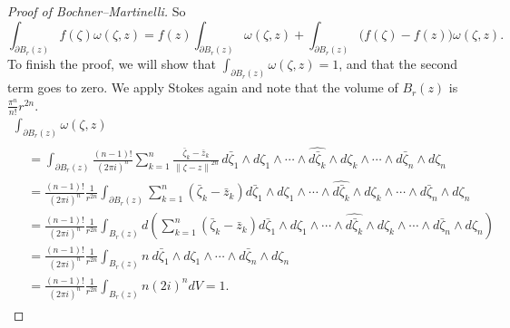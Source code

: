\documentclass[12pt,openany]{book}
\newcommand{\norm}[1]{\left\lVert {#1} \right\rVert}
\theoremstyle{plain}
\theoremstyle{remark}
\theoremstyle{definition}
\theoremstyle{exercise}
\theoremstyle{example}
\begin{document}
\begin{proof}[Proof of Bochner--Martinelli]
So
\begin{equation*}
\int_{\partial B_r(z)}
f(\zeta) \omega(\zeta,z)
=
f(z)
\int_{\partial B_r(z)}
\omega(\zeta,z)
+
\int_{\partial B_r(z)}
\bigl(f(\zeta)-f(z)\bigr) \omega(\zeta,z) .
\end{equation*}
To finish the proof,
we will show that
$\int_{\partial B_r(z)}
\omega(\zeta,z) = 1$, and that the second term goes to zero.
We apply Stokes again
and note that the volume of $B_r(z)$ is
$\frac{\pi^n}{n!}r^{2n}$.
\begin{multline*}
\int_{\partial B_r(z)}
\omega(\zeta,z)
\\
\begin{aligned}
&=
\int_{\partial B_r(z)}
\frac{(n-1)!}{{(2\pi i)}^n}
\sum_{k=1}^n
\frac{\bar{\zeta}_k-\bar{z}_k}{\norm{\zeta-z}^{2n}} \,
d\bar{\zeta}_1 \wedge d\zeta_1 \wedge
\cdots \wedge
\widehat{ d\bar{\zeta}_k } \wedge d\zeta_k \wedge
\cdots \wedge
d\bar{\zeta}_n \wedge d\zeta_n
\\
&=
\frac{(n-1)!}{{(2\pi i)}^n}\frac{1}{r^{2n}}
\int_{\partial B_r(z)}
\sum_{k=1}^n(\bar{\zeta}_k-\bar{z}_k)
d\bar{\zeta}_1 \wedge d\zeta_1 \wedge
\cdots \wedge
\widehat{ d\bar{\zeta}_k } \wedge d\zeta_k \wedge
\cdots \wedge
d\bar{\zeta}_n \wedge d\zeta_n
\\
&=
\frac{(n-1)!}{{(2\pi i)}^n}\frac{1}{r^{2n}}
\int_{B_r(z)}
\!
d\left(
\sum_{k=1}^n(\bar{\zeta}_k-\bar{z}_k)
d\bar{\zeta}_1 \wedge d\zeta_1 \wedge
\cdots \wedge
\widehat{ d\bar{\zeta}_k } \wedge d\zeta_k \wedge
\cdots \wedge
d\bar{\zeta}_n \wedge d\zeta_n
\right)
\\
&=
\frac{(n-1)!}{{(2\pi i)}^n}\frac{1}{r^{2n}}
\int_{B_r(z)}
n~
d\bar{\zeta}_1 \wedge d\zeta_1 \wedge
\cdots \wedge
d\bar{\zeta}_n \wedge d\zeta_n
\\
&=
\frac{(n-1)!}{{(2\pi i)}^n}\frac{1}{r^{2n}}
\int_{B_r(z)}
n
{(2i)}^n dV
=
1 .
\end{aligned}
\end{multline*}


\end{proof}
\end{document}
